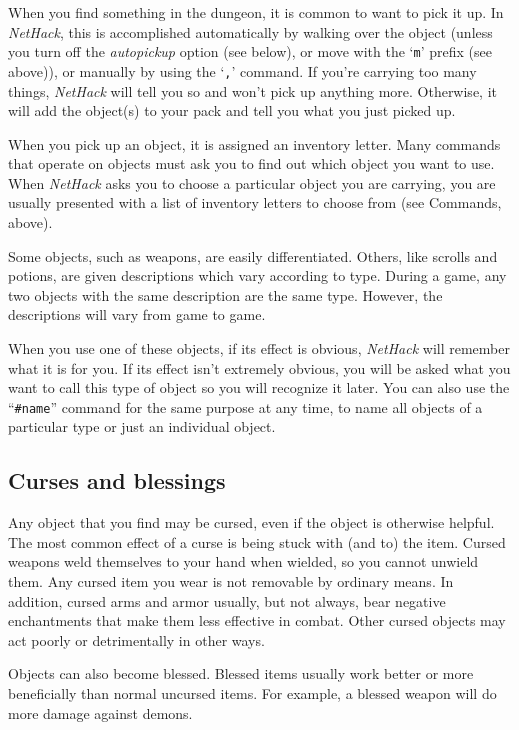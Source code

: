 When you find something in the dungeon, it is common to want to pick
it up.  In {\it NetHack}, this is accomplished automatically by walking over
the object (unless you turn off the {\it autopickup\/}
option (see below), or move with the `{\tt m}' prefix (see above)), or
manually by using the `{\tt ,}' command.  If you're carrying too many
things, {\it NetHack\/} will tell you so and won't pick up anything more.
Otherwise, it will add the object(s) to your pack and tell you what you
just picked up.

When you pick up an object, it is assigned an inventory letter.  Many
commands that operate on objects must ask you to find out which object
you want to use.  When {\it NetHack\/} asks you to choose a particular object
you are carrying, you are usually presented with a list of inventory
letters to choose from (see Commands, above).

Some objects, such as weapons, are easily differentiated.  Others, like
scrolls and potions, are given descriptions which vary according to
type.  During a game, any two objects with the same description are
the same type.  However, the descriptions will vary from game to game.

When you use one of these objects, if its effect is obvious, {\it NetHack\/}
will remember what it is for you.  If its effect isn't extremely
obvious, you will be asked what you want to call this type of object
so you will recognize it later.  You can also use the ``{\tt \#name}''
command for the same purpose at any time, to name all objects of a
particular type or just an individual object.

\subsection*{Curses and blessings}

Any object that you find may be cursed, even if the object is
otherwise helpful.  The most common effect of a curse is being stuck
with (and to) the item.  Cursed weapons weld themselves to your hand
when wielded, so you cannot unwield them.  Any cursed item you wear
is not removable by ordinary means.  In addition, cursed arms and armor
usually, but not always, bear negative enchantments that make them
less effective in combat.  Other cursed objects may act poorly or
detrimentally in other ways.

Objects can also become blessed.  Blessed items usually work better or
more beneficially than normal uncursed items.  For example, a blessed
weapon will do more damage against demons.

